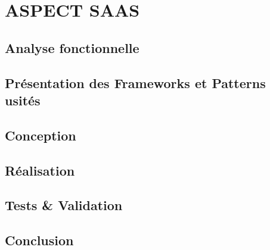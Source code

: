 \setcounter{chapter}{6}
\chapter{ASPECT SAAS}
\minitoc %
\graphicspath{{Chapitre7/figures/}}


\pagestyle{fancy}
\fancyhf{}
\fancyhead[R]{\bfseries\rightmark}
\fancyfoot[R]{\thepage}
\renewcommand{\headrulewidth}{0.5pt}
\renewcommand{\footrulewidth}{0pt}
\renewcommand{\chaptermark}[1]{\markboth{\MakeUppercase{\chaptername~\thechapter. #1 }}{}}
\renewcommand{\sectionmark}[1]{\markright{\thechapter.\thesection~ #1}}

\begin{spacing}{1.5}

\section*{Analyse fonctionnelle}



\section{Présentation des Frameworks et Patterns usités}


\section{Conception}


\section{Réalisation}


\section{Tests \& Validation}


\section*{Conclusion}


\end{spacing}
